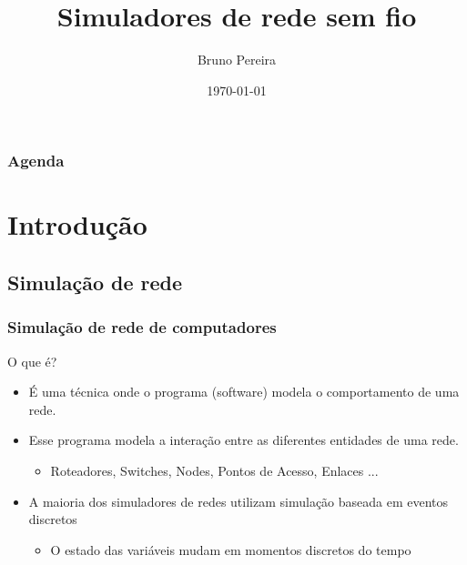 \documentclass{beamer}
\title[Simuladores de rede Sem Fio]{Simuladores de rede sem fio} %
\author{Bruno Pereira} %
\institute[UFMG] %
{
Universidade Federal de Minas Gerais \\ %
\medskip
\textit{bruno.ps@dcc.ufmg.com} %
}
\date{\tiny\today} %
\begin{document}
\begin{frame}
\titlepage %
\end{frame}

\begin{frame}
\frametitle{Agenda} %
\tableofcontents %
\end{frame}


\section{Introdução} %

\subsection{Simulação de rede} %

\begin{frame}\frametitle{Simulação de rede de computadores}

\begin{block}{O que é?}
\begin{itemize}
	\item É uma técnica onde o programa (software) modela o comportamento de uma rede.
	\item Esse programa modela a interação entre as diferentes entidades de uma rede.
	\begin{itemize}
		\item Roteadores, Switches, Nodes, Pontos de Acesso, Enlaces ...
	\end{itemize}
	\item A maioria dos simuladores de redes utilizam simulação baseada em eventos discretos
	\begin{itemize}
		\item O estado das variáveis mudam em momentos discretos do tempo
	\end{itemize}
\end{itemize}
\end{block}

\end{frame}
\end{document}
